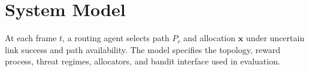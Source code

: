 \documentclass[10pt,journal]{IEEEtran}
\begin{document}
\section{System Model}
\label{sec:SystemModel}

At each frame $t$, a routing agent selects path $P_r$ and allocation $\mathbf{x}$ under uncertain link success and path availability. The model specifies the topology, reward process, threat regimes, allocators, and bandit interface used in evaluation.

\end{document}
